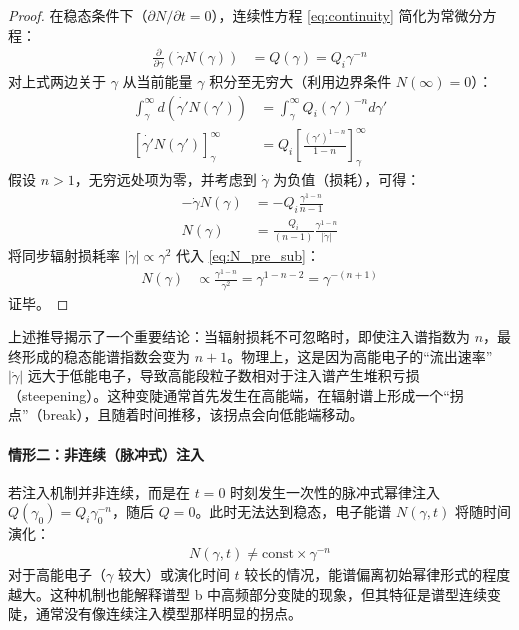 \begin{proof}
在稳态条件下（$\partial N / \partial t = 0$），连续性方程 \eqref{eq:continuity} 简化为常微分方程：
\begin{align}
\frac{\partial}{\partial \gamma} \left( \dot{\gamma} N(\gamma) \right) &= Q(\gamma) = Q_i \gamma^{-n}
\end{align}
对上式两边关于 $\gamma$ 从当前能量 $\gamma$ 积分至无穷大（利用边界条件 $N(\infty)=0$）：
\begin{align}
\int_{\gamma}^{\infty} d \left( \dot{\gamma'} N(\gamma') \right) &= \int_{\gamma}^{\infty} Q_i (\gamma')^{-n} d\gamma' \\
\left[ \dot{\gamma'} N(\gamma') \right]_{\gamma}^{\infty} &= Q_i \left[ \frac{(\gamma')^{1-n}}{1-n} \right]_{\gamma}^{\infty}
\end{align}
假设 $n > 1$，无穷远处项为零，并考虑到 $\dot{\gamma}$ 为负值（损耗），可得：
\begin{align}
- \dot{\gamma} N(\gamma) &= - Q_i \frac{\gamma^{1-n}}{n-1} \\
N(\gamma) &= \frac{Q_i}{(n-1)} \frac{\gamma^{1-n}}{|\dot{\gamma}|} \label{eq:N_pre_sub}
\end{align}
将同步辐射损耗率 $|\dot{\gamma}| \propto \gamma^2$ 代入 \eqref{eq:N_pre_sub}：
\begin{align}
N(\gamma) &\propto \frac{\gamma^{1-n}}{\gamma^2} = \gamma^{1-n-2} = \gamma^{-(n+1)}
\end{align}
证毕。
\end{proof}

\begin{derivationnote}[能谱变陡的物理图景]
上述推导揭示了一个重要结论：当辐射损耗不可忽略时，即使注入谱指数为 $n$，最终形成的稳态能谱指数会变为 $n+1$。物理上，这是因为高能电子的“流出速率” $|\dot{\gamma}|$ 远大于低能电子，导致高能段粒子数相对于注入谱产生堆积亏损（steepening）。这种变陡通常首先发生在高能端，在辐射谱上形成一个“拐点”（break），且随着时间推移，该拐点会向低能端移动。
\end{derivationnote}

\paragraph{情形二：非连续（脉冲式）注入}

若注入机制并非连续，而是在 $t=0$ 时刻发生一次性的脉冲式幂律注入 $Q(\gamma_0) = Q_i \gamma_0^{-n}$，随后 $Q=0$。此时无法达到稳态，电子能谱 $N(\gamma, t)$ 将随时间演化：
\begin{align}
N(\gamma, t) \neq \text{const} \times \gamma^{-n}
\end{align}
对于高能电子（$\gamma$ 较大）或演化时间 $t$ 较长的情况，能谱偏离初始幂律形式的程度越大。这种机制也能解释谱型 b 中高频部分变陡的现象，但其特征是谱型连续变陡，通常没有像连续注入模型那样明显的拐点。

